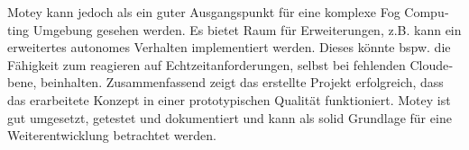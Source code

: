 \begin{otherlanguage}{ngerman}
Motey kann jedoch als ein guter Ausgangspunkt für eine komplexe Fog Computing Umgebung gesehen werden.
Es bietet Raum für Erweiterungen, z.B. kann ein erweitertes autonomes Verhalten implementiert werden.
Dieses könnte bspw. die Fähigkeit zum reagieren auf Echtzeitanforderungen, selbst bei fehlenden Cloudebene, beinhalten.
Zusammenfassend zeigt das erstellte Projekt erfolgreich, dass das erarbeitete Konzept in einer prototypischen Qualität funktioniert.
Motey ist gut umgesetzt, getestet und dokumentiert und kann als solid Grundlage für eine Weiterentwicklung betrachtet werden.
\end{otherlanguage}
